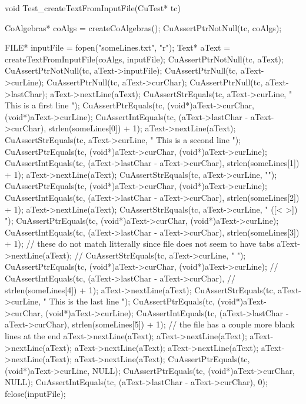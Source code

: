 void Test_createTextFromInputFile(CuTest* tc) {
  CoAlgebras* coAlgs = createCoAlgebras();
  CuAssertPtrNotNull(tc, coAlgs);

  FILE* inputFile = fopen("someLines.txt", "r");
  Text* aText = createTextFromInputFile(coAlgs, inputFile);
  CuAssertPtrNotNull(tc, aText);
  CuAssertPtrNotNull(tc, aText->inputFile);
  CuAssertPtrNull(tc, aText->curLine);
  CuAssertPtrNull(tc, aText->curChar);
  CuAssertPtrNull(tc, aText->lastChar);
  aText->nextLine(aText);
  CuAssertStrEquals(tc, aText->curLine, "  This is a first line  \n");
  CuAssertPtrEquals(tc, (void*)aText->curChar, (void*)aText->curLine);
  CuAssertIntEquals(tc, (aText->lastChar - aText->curChar),
                        strlen(someLines[0]) + 1);
  aText->nextLine(aText);
  CuAssertStrEquals(tc, aText->curLine, "  This is a second line   \n");
  CuAssertPtrEquals(tc, (void*)aText->curChar, (void*)aText->curLine);
  CuAssertIntEquals(tc, (aText->lastChar - aText->curChar),
                        strlen(someLines[1]) + 1);
  aText->nextLine(aText);
  CuAssertStrEquals(tc, aText->curLine, "\n");
  CuAssertPtrEquals(tc, (void*)aText->curChar, (void*)aText->curLine);
  CuAssertIntEquals(tc, (aText->lastChar - aText->curChar),
                        strlen(someLines[2]) + 1);
  aText->nextLine(aText);
  CuAssertStrEquals(tc, aText->curLine, " ([<{ }>]) \n");
  CuAssertPtrEquals(tc, (void*)aText->curChar, (void*)aText->curLine);
  CuAssertIntEquals(tc, (aText->lastChar - aText->curChar),
                        strlen(someLines[3]) + 1);
  // these do not match litterally since file does not seem to have tabs
  aText->nextLine(aText);
//  CuAssertStrEquals(tc, aText->curLine, "     	\n");
  CuAssertPtrEquals(tc, (void*)aText->curChar, (void*)aText->curLine);
//  CuAssertIntEquals(tc, (aText->lastChar - aText->curChar),
//                        strlen(someLines[4]) + 1);
  aText->nextLine(aText);
  CuAssertStrEquals(tc, aText->curLine, "  This is the last line  \n");
  CuAssertPtrEquals(tc, (void*)aText->curChar, (void*)aText->curLine);
  CuAssertIntEquals(tc, (aText->lastChar - aText->curChar),
                        strlen(someLines[5]) + 1);
  // the file has a couple more blank lines at the end
  aText->nextLine(aText);
  aText->nextLine(aText);
  aText->nextLine(aText);
  aText->nextLine(aText);
  aText->nextLine(aText);
  aText->nextLine(aText);
  aText->nextLine(aText);
  CuAssertPtrEquals(tc, (void*)aText->curLine, NULL);
  CuAssertPtrEquals(tc, (void*)aText->curChar, NULL);
  CuAssertIntEquals(tc, (aText->lastChar - aText->curChar), 0);
  fclose(inputFile);
}

